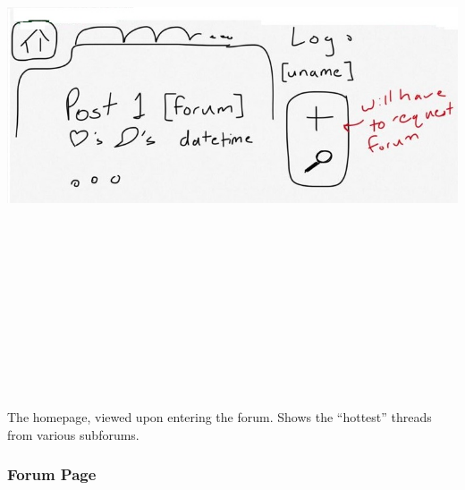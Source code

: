 \documentclass[12pt]{scrartcl}
\begin{document}
\includegraphics[width=17cm, height=17cm, keepaspectratio]{homepage.jpg}

The homepage, viewed upon entering the forum. Shows the “hottest” threads from various subforums.

\subsubsection{Forum Page}
\end{document}
